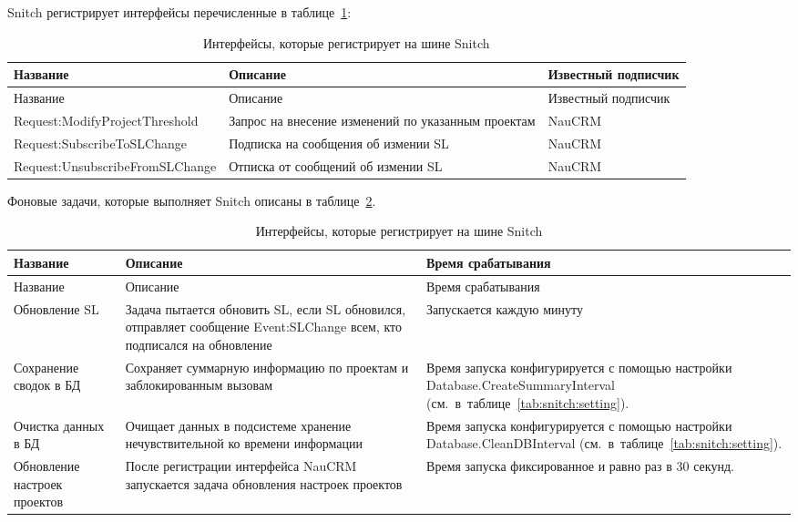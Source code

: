 Snitch регистрирует интерфейсы перечисленные в таблице~\ref{tab:snitch:provide-intr}:
\begin{small}
    \begin{longtable}{|p{}|p{}|p{}|}
        \caption{Интерфейсы, которые регистрирует на шине Snitch}
        \label{tab:snitch:provide-intr}
        \\ \hline
         Название & Описание & Известный подписчик \\
        \hline \endfirsthead
        \hline
        Название & Описание & Известный подписчик \\
        \hline
        \endhead
        \hline \endlastfoot
        Request:ModifyProjectThreshold & Запрос на внесение изменений по указанным проектам & NauCRM \\
        \hline
        Request:SubscribeToSLChange & Подписка на сообщения об измении SL & NauCRM \\
        \hline
        Request:UnsubscribeFromSLChange & Отписка от сообщений об измении SL & NauCRM \\
    \end{longtable}
\end{small}

Фоновые задачи, которые выполняет Snitch описаны в таблице~\ref{tab:snitch:background-task}.
\begin{small}
    \begin{longtable}{|p{}|p{}|p{}|}
        \caption{Интерфейсы, которые регистрирует на шине Snitch}
        \label{tab:snitch:background-task}
        \\ \hline
        Название & Описание & Время срабатывания \\
        \hline \endfirsthead
        \hline
        Название & Описание & Время срабатывания \\
        \hline
        \endhead
        \hline \endlastfoot
        Обновление SL &
        Задача пытается обновить SL,
        если SL обновился, отправляет сообщение Event:SLChange всем, кто подписался на обновление &
        Запускается каждую минуту \\
        \hline
        Сохранение сводок в БД &
        Сохраняет суммарную информацию по проектам и заблокированным вызовам &
        Время запуска конфигурируется с помощью настройки Database.CreateSummaryInterval (см.~в~таблице~\ref{tab:snitch:setting}). \\
        \hline
        Очистка данных в БД &
        Очищает данных в подсистеме хранение нечувствительной ко времени информации &
        Время запуска конфигурируется с помощью настройки Database.CleanDBInterval (см.~в~таблице~\ref{tab:snitch:setting}). \\
        \hline
        Обновление настроек проектов &
        После регистрации интерфейса NauCRM запускается задача обновления настроек проектов &
        Время запуска фиксированное и равно раз в 30 секунд. \\
    \end{longtable}
\end{small}

